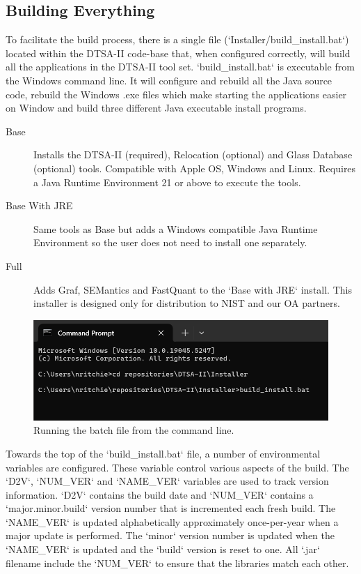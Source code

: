 \documentclass{article}
\begin{document}
\subsection{Building Everything}
To facilitate the build process, there is a single file (`Installer/build\_install.bat`) located within the DTSA-II code-base that, when configured correctly, will build all the applications in the DTSA-II tool set.  `build\_install.bat` is executable from the Windows command line.  It will configure and rebuild all the Java source code, rebuild the Windows .exe files which make starting the applications easier on Window and build three different Java executable install programs.

\begin{description}
    \item[Base] Installs the DTSA-II (required), Relocation (optional) and Glass Database (optional) tools.  Compatible with Apple OS, Windows and Linux.  Requires a Java Runtime Environment 21 or above to execute the tools.
    \item[Base With JRE] Same tools as Base but adds a Windows compatible Java Runtime Environment so the user does not need to install one separately.
    \item[Full] Adds Graf, SEMantics and FastQuant to the `Base with JRE` install.  This installer is designed only for distribution to NIST and our OA partners.
\end{description}

\begin{figure}
    \centering
    \includegraphics[width=0.5\linewidth]{CmdPmt_build_install.bat.png}
    \caption{Running the batch file from the command line.}
    \label{fig:batch}
\end{figure}

Towards the top of the `build\_install.bat` file, a number of environmental variables are configured. These variable control various aspects of the build. The `D2V`, `NUM\_VER` and `NAME\_VER` variables are used to track version information.  `D2V` contains the build date and `NUM\_VER` contains a `major.minor.build` version number that is incremented each fresh build.  The `NAME\_VER` is updated alphabetically approximately once-per-year when a major update is performed.  The `minor` version number is updated when the `NAME\_VER` is updated and the `build` version is reset to one.  All `.jar` filename include the `NUM\_VER` to ensure that the libraries match each other.
\end{document}
